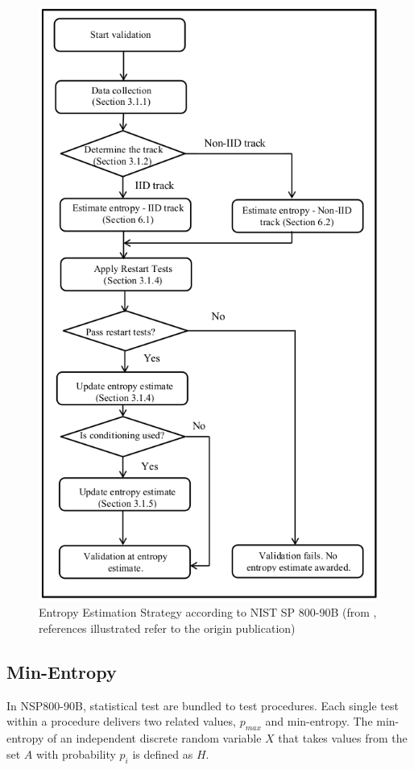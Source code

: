  \begin{figure}[H]
 	\centering
 	\includegraphics[scale=0.6]{img/nsp800-90b-entropy-est-strategy.png}
 	\caption{Entropy Estimation Strategy according to NIST SP 800-90B (from \cite{turan2018nist}, references illustrated refer to the origin publication)}
 	\label{fig-entropy-est-strategy}
 \end{figure}

\subsection{Min-Entropy}\label{sub:min-entropy}
In NSP800-90B, statistical test are bundled to test procedures. Each single test within a procedure delivers two related values, $p_{max}$ and min-entropy. The min-entropy of an independent discrete random variable $X$
that takes values from the set $A$ with probability $p_i$ is defined as $H$.

